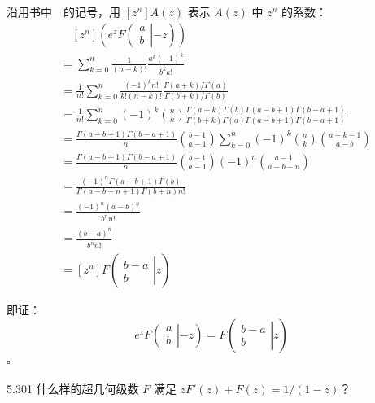 沿用书中~\cite{graham1994concrete}~的记号，用 \( [z^n] A(z) \) 表示 \( A(z) \) 中 \( z^n \) 的系数：
\begin{align*}
  & \quad [z^n] ( e^z F
    \left( \left.
      \begin{array}{cccc}
        a \\
        b
  \end{array} \right|{-z} \right) ) \\
  &= \sum_{k=0}^n \frac{1}{(n-k)!} \frac{a^{\overline{k}} (-1)^k}{b^{\overline{k}} k!} \\
  &= \frac{1}{n!} \sum_{k=0}^n \frac{(-1)^k n!}{k! (n-k)!} \frac{\Gamma{(a+k)} / \Gamma{(a)}}{\Gamma{(b+k)} / \Gamma{(b)}} \\
  &= \frac{1}{n!} \sum_{k=0}^n (-1)^k \binom{n}{k} \frac{\Gamma{(a+k)} \Gamma{(b)} \Gamma{(a-b+1)} \Gamma{(b-a+1)}}{\Gamma{(b+k)} \Gamma{(a)} \Gamma{(a-b+1)} \Gamma{(b-a+1)}} \\
  &= \frac{\Gamma{(a-b+1)} \Gamma{(b-a+1)}}{n!} \binom{b-1}{a-1} \sum_{k=0}^n (-1)^k \binom{n}{k} \binom{a+k-1}{a-b} \\
  &= \frac{\Gamma{(a-b+1)} \Gamma{(b-a+1)}}{n!} \binom{b-1}{a-1} (-1)^n \binom{a-1}{a-b-n} \\
  &= \frac{(-1)^n \Gamma{(a-b+1)} \Gamma{(b)}}{\Gamma{(a-b-n+1)} \Gamma{(b+n)} n!} \\
  &= \frac{(-1)^n (a-b)^{\underline{n}}}{b^{\overline{n}} n!} \\
  &= \frac{(b-a)^{\overline{n}}}{b^{\overline{n}} n!} \\
  &= [z^n]
  F
  \left( \left.
    \begin{array}{cccc}
      b-a \\
      b
  \end{array} \right|{z} \right)
\end{align*}

即证：
\[
  e^z F
  \left( \left.
    \begin{array}{cccc}
      a \\
      b
  \end{array} \right|{-z} \right)
  =
  F
  \left( \left.
    \begin{array}{cccc}
      b-a \\
      b
  \end{array} \right|{z} \right)
\]
\hfill \( \square \)

\begin{problem}{5.30}{1}
  什么样的超几何级数 \( F \) 满足 \( zF'(z) + F(z) = 1 / (1-z) \)？
\end{problem}

